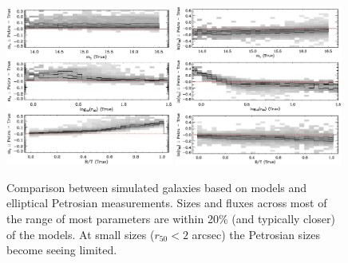 \documentclass[10pt,preprint]{aastex}
\newcounter{thefigs}
\newcommand{\fignum}{\arabic{thefigs}}
\begin{document}
\begin{figure} 
\figurenum{\fignum}
\includegraphics[width=0.49\textwidth]{test-simard-petro-flux-vA.ps} \quad
\includegraphics[width=0.49\textwidth]{test-simard-petro-r50-vA.ps} 
\caption{\label{fig:petro} Comparison between simulated galaxies based
  on \citet{simard11a} models and elliptical Petrosian
  measurements. Sizes and fluxes across most of the range of most
  parameters are within 20\% (and typically closer) of the models. At
  small sizes ($r_{50} < 2$ arcsec) the Petrosian sizes become seeing
  limited. }
\end{figure}
\end{document}

